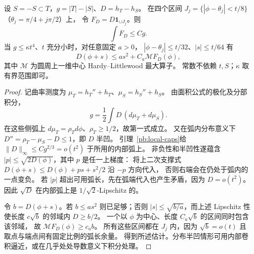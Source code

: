 \begin{lemma}[支撑缺口的局部最大函数控制]\label{pb:arc-maximal}
设 $S=-S\subset T$，$g=|T|-|S|$、$D=h_T-h_S$。
在四个区间 $J_j=\{|\phi-\theta_j|<t/8\}$（$\theta_j=\pi/4+j\pi/2$）上，
令 $F_D=D\mathbf1_{\cup J_j}$。则
\[
 \int F_D\le Cg.
\]
当 $g\le\kappa t^4$、$t$ 充分小时，对任意固定 $a>0$，
$|\phi-\theta_j|\le t/32$、$|s|\le t/64$ 有
\[
 D(\phi+s)\le a s^2+C_a\mathcal M F_D(\phi),
\]
其中 $\mathcal M$ 为圆周上一维中心 Hardy--Littlewood 最大算子。
常数不依赖 $t,S$；$\kappa$ 取有界范围即可。
\end{lemma}
\begin{proof}
记曲率测度为 $\mu_T=h_T''+h_T$、$\mu_S=h_S''+h_S$。
由面积公式的极化及分部积分，
\[
 g=\frac12\int D\,(d\mu_T+d\mu_S).
\]
在这些侧弧上 $d\mu_T=\rho_Td\phi$、$\rho_T\ge1/2$，故第一式成立。
又在弧内分布意义下
$D''=\rho_T-\mu_S-D\le1$，即 $D$ 半凹。
引理~\ref{pb:local-caps}给 $\|D\|_\infty\le Cg^{2/3}=o(t^2)$ 于所用的内部弧上。
非负性和半凹性遂蕴含 $|p|\le\sqrt{2D(\phi)}$，其中 $p$ 是任一上梯度：
将上二次支撑式 $D(\phi+s)\le D(\phi)+ps+s^2/2$ 沿 $-p$ 方向代入，
否则右端会在仍处于弧内的一点变负。
若 $|p|$ 超出可用弧长，先在弧端代入也产生矛盾，因为 $D=o(t^2)$。
因此 $\sqrt D$ 在内部弧上是 $1/\sqrt2$-Lipschitz 的。

令 $b=D(\phi+s)$。若 $b\le as^2$ 则已足够；否则
$|s|\le\sqrt{b/a}$，而上述 Lipschitz 性使长度 $c\sqrt b$ 的邻域内 $D\ge b/2$。
一个以 $\phi$ 为中心、长度 $C_a\sqrt b$ 的区间同时包含该邻域，
故 $\mathcal M F_D(\phi)\ge c_a b$。
所有这些区间都在 $J_j$ 内，因为 $\sqrt b=o(t)$ 且取点与端点间有固定比例的弧长余量。
得到所述估计。分布半凹情形可用内部卷积逼近，或在几乎处处导数意义下积分处理。
\end{proof}

